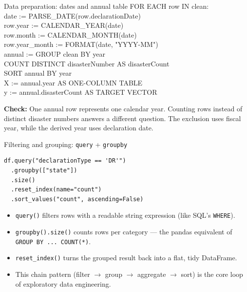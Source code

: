 \documentclass[11pt,aspectratio=43]{beamer}
\begin{document}
\begin{frame}{Data preparation: dates and annual table}
\ttfamily\small
FOR EACH row IN clean:\\
\hspace*{2em}date := PARSE\_DATE(row.declarationDate)\\
\hspace*{2em}row.year := CALENDAR\_YEAR(date)\\
\hspace*{2em}row.month := CALENDAR\_MONTH(date)\\
\hspace*{2em}row.year\_month := FORMAT(date, "YYYY-MM")\\[0.7em]
annual := GROUP clean BY year\\
\hspace*{2em}COUNT DISTINCT disasterNumber AS disasterCount\\
SORT annual BY year\\[0.7em]
X := annual.year AS ONE-COLUMN TABLE\\
y := annual.disasterCount AS TARGET VECTOR
\vspace{0.7em}

\normalfont\small
\textbf{Check:} One annual row represents one calendar year. Counting rows instead of distinct disaster numbers answers a different question. The exclusion uses fiscal year, while the derived year uses declaration date.
\end{frame}











\begin{frame}[fragile]{Filtering and grouping: \texttt{query} + \texttt{groupby}}
\begin{lstlisting}
df.query("declarationType == 'DR'")
  .groupby(["state"])
  .size()
  .reset_index(name="count")
  .sort_values("count", ascending=False)
\end{lstlisting}
\begin{itemize}
  \item \texttt{query()} filters rows with a readable string expression (like SQL's \texttt{WHERE}).
  \item \texttt{groupby().size()} counts rows per category --- the pandas equivalent of \texttt{GROUP BY ... COUNT(*)}.
  \item \texttt{reset\_index()} turns the grouped result back into a flat, tidy DataFrame.
  \item This chain pattern (filter $\to$ group $\to$ aggregate $\to$ sort) is the core loop of exploratory data engineering.
\end{itemize}
\end{frame}
\end{document}
